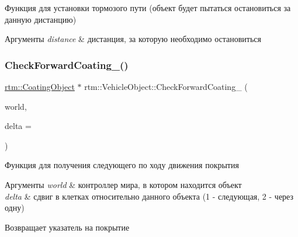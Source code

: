 Функция для установки тормозого пути (объект будет пытаться остановиться за данную дистанцию) 


\begin{DoxyParams}{Аргументы}
{\em distance} & дистанция, за которую необходимо остановиться \\
\hline
\end{DoxyParams}
\mbox{\label{classrtm_1_1_vehicle_object_a3756c9823f032ce8647343291fdbd00b}} 
\subsubsection{\texorpdfstring{Check\+Forward\+Coating\+\_\+()}{CheckForwardCoating\_()}}
{\footnotesize\ttfamily \hyperlink{classrtm_1_1_coating_object}{rtm\+::\+Coating\+Object} $\ast$ rtm\+::\+Vehicle\+Object\+::\+Check\+Forward\+Coating\+\_\+ (\begin{DoxyParamCaption}\item[{\hyperlink{classrtm_1_1_world_controller}{World\+Controller} $\ast$const}]{world,  }\item[{int}]{delta = {} }\end{DoxyParamCaption})\hspace{0.3cm}{\ttfamily [protected]}}



Функция для получения следующего по ходу движения покрытия 


\begin{DoxyParams}{Аргументы}
{\em world} & контроллер мира, в котором находится объект \\
\hline
{\em delta} & сдвиг в клетках относительно данного объекта (1 -\/ следующая, 2 -\/ через одну) \\
\hline
\end{DoxyParams}
\begin{DoxyReturn}{Возвращает}
указатель на покрытие 
\end{DoxyReturn}
\mbox{\label{classrtm_1_1_vehicle_object_a96e80f98cc6aa50ab3f822e06223e345}} 
